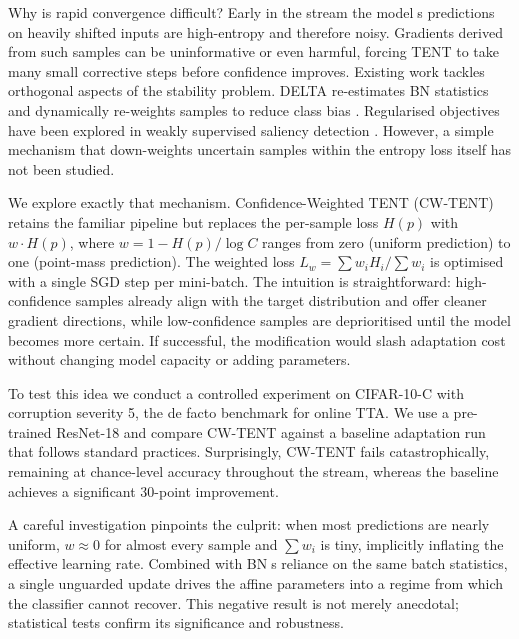 \documentclass{article} %
\begin{document}
Why is rapid convergence difficult? Early in the stream the models predictions on heavily shifted inputs are high-entropy and therefore noisy. Gradients derived from such samples can be uninformative or even harmful, forcing TENT to take many small corrective steps before confidence improves. Existing work tackles orthogonal aspects of the stability problem. DELTA re-estimates BN statistics and dynamically re-weights samples to reduce class bias \cite{zhao-2023-delta}. Regularised objectives have been explored in weakly supervised saliency detection \cite{author-year-test}. However, a simple mechanism that down-weights uncertain samples within the entropy loss itself has not been studied.

We explore exactly that mechanism. Confidence-Weighted TENT (CW-TENT) retains the familiar pipeline but replaces the per-sample loss \(H(p)\) with \(w\cdot H(p)\), where \(w = 1 - H(p)/\log C\) ranges from zero (uniform prediction) to one (point-mass prediction). The weighted loss \(L_{w} = \sum w_i H_i / \sum w_i\) is optimised with a single SGD step per mini-batch. The intuition is straightforward: high-confidence samples already align with the target distribution and offer cleaner gradient directions, while low-confidence samples are deprioritised until the model becomes more certain. If successful, the modification would slash adaptation cost without changing model capacity or adding parameters.

To test this idea we conduct a controlled experiment on CIFAR-10-C with corruption severity 5, the de facto benchmark for online TTA. We use a pre-trained ResNet-18 and compare CW-TENT against a baseline adaptation run that follows standard practices. Surprisingly, CW-TENT fails catastrophically, remaining at chance-level accuracy throughout the stream, whereas the baseline achieves a significant 30-point improvement.

A careful investigation pinpoints the culprit: when most predictions are nearly uniform, \(w \approx 0\) for almost every sample and \(\sum w_i\) is tiny, implicitly inflating the effective learning rate. Combined with BNs reliance on the same batch statistics, a single unguarded update drives the affine parameters into a regime from which the classifier cannot recover. This negative result is not merely anecdotal; statistical tests confirm its significance and robustness.
\end{document}
